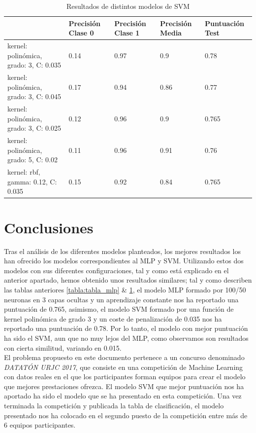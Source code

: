 \documentclass[journal,twoside]{JoPhA}
\begin{document}
	\begin{table}[htb!]
		\begin{center}
			\caption{Resultados de distintos modelos de SVM}
			\begin{tabular}{| p{2.1cm} | p{1cm} | p{1cm} | p{1cm} | p{1.2cm} |}
				\hline
				& Precisión Clase 0 & Precisión Clase 1 & Precisión Media & Puntuación Test   \\ \hline
				kernel: polinómica, grado: 3, C: 0.035 & 0.14                & 0.97                & 0.9              & 0.78  \\ \hline
				kernel: polinómica, grado: 3, C: 0.045 & 0.17                & 0.94               & 0.86             & 0.77  \\ \hline
				kernel: polinómica, grado: 3, C: 0.025 & 0.12 & 0.96 & 0.9 & 0.765 \\ \hline
				kernel: polinómica, grado: 5, C: 0.02 & 0.11 & 0.96 & 0.91 & 0.76	\\ \hline
				kernel: rbf, gamma: 0.12, C: 0.035 & 0.15 & 0.92 & 0.84 & 0.765 \\ \hline
				
			\end{tabular}
			
			\label{tabla:tabla_svm}
		\end{center}
	\end{table}
	

\section{Conclusiones}
Tras el análisis de los diferentes modelos planteados, los mejores resultados los han ofrecido los modelos correspondientes al MLP y SVM. Utilizando estos dos modelos con sus diferentes configuraciones, tal y como está explicado en el anterior apartado, hemos obtenido unos resultados similares; tal y como describen las tablas anteriores \ref{tabla:tabla_mlp} \& \ref{tabla:tabla_svm}, el modelo MLP formado por 100/50 neuronas en 3 capas ocultas y un aprendizaje constante nos ha reportado una puntuación de 0.765, asimismo, el modelo SVM formado por una función de kernel polinómica de grado 3 y un coste de penalización de 0.035 nos ha reportado una puntuación de 0.78. Por lo tanto, el modelo con mejor puntuación ha sido el SVM, aun que no muy lejos del MLP, como observamos son resultados con cierta similitud, variando en 0.015.\\

El problema propuesto en este documento pertenece a un concurso denominado \textit{DATATÓN URJC 2017}, que consiste en una competición de Machine Learning con datos reales en el que los participantes forman equipos para crear el modelo que mejores prestaciones ofrezca. El modelo SVM que mejor puntuación nos ha aportado ha sido el modelo que se ha presentado en esta competición. Una vez terminada la competición y publicada la tabla de clasificación, el modelo presentado nos ha colocado en el segundo puesto de la competición entre más de 6 equipos participantes.\\
\end{document}
